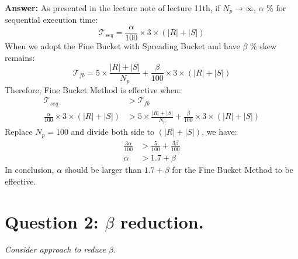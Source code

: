 \documentclass[a4paper,12pt]{article}
\begin{document}
\vspace{1.5em}
\noindent
\textbf{Answer:} 
\noindent
As presented in the lecture note of lecture 11th, if $N_p \rightarrow \infty$, $\alpha$ \% for sequential execution time:
$$ \mathcal{T}_{seq} = \frac{\alpha}{100} \times 3 \times (|R| + |S|) $$
When we adopt the Fine Bucket with Spreading Bucket and have $\beta$ \% skew remains:
$$ \mathcal{T}_{fb} = 5 \times \frac{|R| + |S|}{N_p} + \frac{\beta}{100} \times 3 \times (|R| + |S|) $$
Therefore, Fine Bucket Method is effective when:
\begin{equation*}
	\begin{aligned}
		\mathcal{T}_{seq} & > \mathcal{T}_{fb} \\
		\frac{\alpha}{100} \times 3 \times (|R| + |S|) & > 5 \times \frac{|R| + |S|}{N_p} + \frac{\beta}{100} \times 3 \times (|R| + |S|) 
	\end{aligned}
\end{equation*}
Replace $N_p = 100$ and divide both side to $(|R| + |S|)$, we have:
\begin{equation*}
	\begin{aligned}
		\frac{3 \alpha}{100} & > \frac{5}{100} + \frac{3 \beta}{100} \\
		\alpha & > 1.7 + \beta
	\end{aligned}
\end{equation*}
In conclusion, $\alpha$ should be larger than $1.7 + \beta$ for the Fine Bucket Method to be effective.

\section*{Question 2: $\beta$ reduction.}
\setcounter{section}{1}

\textit{Consider approach to reduce $\beta$.} 
\end{document}
